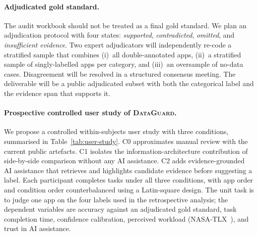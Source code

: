 \documentclass[11pt,a4paper]{article}
\newcommand{\dataguard}{\textsc{DataGuard}}
\begin{document}
\paragraph{Adjudicated gold standard.}
The audit workbook should not be treated as a final gold standard. We
plan an adjudication protocol with four states: \emph{supported},
\emph{contradicted}, \emph{omitted}, and \emph{insufficient evidence}.
Two expert adjudicators will independently re-code a stratified sample
that combines (i)~all double-annotated apps, (ii)~a stratified sample
of singly-labelled apps per category, and (iii)~an oversample of no-data
cases. Disagreement will be resolved in a structured consensus meeting.
The deliverable will be a public adjudicated subset with both the
categorical label and the evidence span that supports it.

\paragraph{Prospective controlled user study of \dataguard{}.}
We propose a controlled within-subjects user study with three
conditions, summarised in Table~\ref{tab:user-study}. C0 approximates
manual review with the current public artefacts. C1 isolates the
information-architecture contribution of side-by-side comparison
without any AI assistance. C2 adds evidence-grounded AI assistance
that retrieves and highlights candidate evidence before suggesting a
label. Each participant completes tasks under all three conditions,
with app order and condition order counterbalanced using a Latin-square
design. The unit task is to judge one app on the four labels used in
the retrospective analysis; the dependent variables are accuracy
against an adjudicated gold standard, task completion time, confidence
calibration, perceived workload (NASA-TLX~\citep{hart2008measurement}),
and trust in AI assistance.
\end{document}
